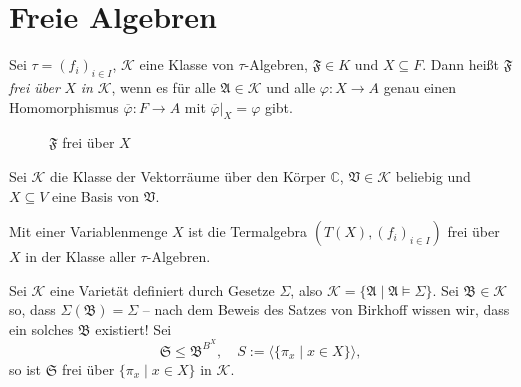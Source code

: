 \section{Freie Algebren}

\begin{definition}
Sei $ \tau = (f_i)_{i \in I}$, $\mathcal{K}$ eine Klasse von $\tau$-Algebren, $\mathfrak{F} \in K$ und $X \subseteq F$. Dann heißt $\mathfrak{F}$ \emph{frei über} $X$ \emph{in} $\mathcal{K}$, wenn es für alle $\mathfrak{A} \in \mathcal{K}$ und alle $\varphi : X \to A$ genau einen Homomorphismus $\overline{\varphi} : F \to A$ mit $\overline{\varphi} \vert_X = \varphi$ gibt.

\begin{figure}[H]
    \centering
    \caption{$\mathfrak{F}$ frei über $X$}
\end{figure}
\end{definition}

\begin{example}
    Sei $\mathcal{K}$ die Klasse der Vektorräume über den Körper $\mathbb{C}$, $\mathfrak{V} \in \mathcal{K}$ beliebig und $X \subseteq V$ eine Basis von $\mathfrak{V}$.

    Mit einer Variablenmenge $X$ ist die Termalgebra $(T(X), (f_i)_{i \in I})$ frei über $X$ in der Klasse aller $\tau$-Algebren.
\end{example}

\begin{example}
    Sei $\mathcal{K}$ eine Varietät definiert durch Gesetze $\Sigma$, also $\mathcal{K} = \{ \mathfrak{A} \mid \mathfrak{A} \models \Sigma \}$. Sei $\mathfrak{B} \in \mathcal{K}$ so, dass $\Sigma(\mathfrak{B}) = \Sigma$ -- nach dem Beweis des Satzes von Birkhoff wissen wir, dass ein solches $\mathfrak{B}$ existiert! Sei
    $$ \mathfrak{S} \leq \mathfrak{B}^{B^X}, \quad S := \langle \{ \pi_x \mid x \in X \} \rangle, $$
    so ist $\mathfrak{S}$ frei über $\{ \pi_x \mid x \in X \}$ in $\mathcal{K}$.
\end{example}

